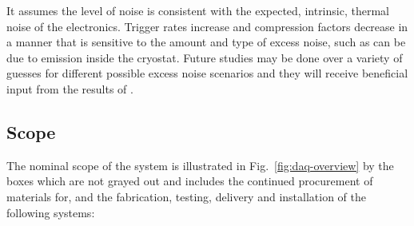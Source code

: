 It assumes the level of noise is consistent with the expected,
intrinsic, thermal noise of the electronics.
Trigger rates increase and compression factors decrease in a manner
that is sensitive to the amount and type of excess noise, such as can
be due to  emission inside the cryostat. 
Future studies may be done over a variety of guesses for different
possible excess noise scenarios and they will receive beneficial input
from the results of .









\subsection{Scope}
\label{sec:fd-daq-scope}


The nominal scope of the  system is illustrated in
Fig.~\ref{fig:daq-overview} by the boxes which are not grayed out and
includes the continued procurement of materials for, and the
fabrication, testing, delivery and installation of the following
systems:

